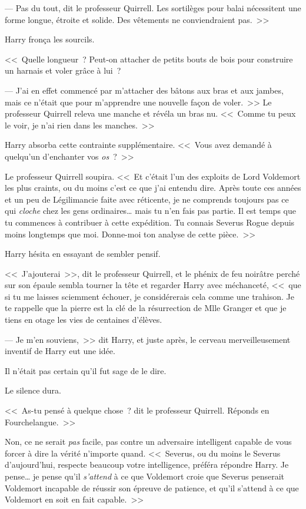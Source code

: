 --- Pas du tout, dit le professeur Quirrell. Les sortilèges pour balai nécessitent une forme longue, étroite et solide. Des vêtements ne conviendraient pas.~>>

Harry fronça les sourcils.

<<~Quelle longueur~? Peut-on attacher de petits bouts de bois pour construire un harnais et voler grâce à lui~?

--- J'ai en effet commencé par m'attacher des bâtons aux bras et aux jambes, mais ce n'était que pour m'apprendre une nouvelle façon de voler.~>> Le professeur Quirrell releva une manche et révéla un bras nu. <<~Comme tu peux le voir, je n'ai rien dans les manches.~>>

Harry absorba cette contrainte supplémentaire. <<~Vous avez demandé à quelqu'un d'enchanter vos \emph{os}~?~>>

Le professeur Quirrell soupira. <<~Et c'était l'un des exploits de Lord Voldemort les plus craints, ou du moins c'est ce que j'ai entendu dire. Après toute ces années et un peu de Légilimancie faite avec réticente, je ne comprends toujours pas ce qui \emph{cloche} chez les gens ordinaires… mais tu n'en fais pas partie. Il est temps que tu commences à contribuer à cette expédition. Tu connais Severus Rogue depuis moins longtemps que moi. Donne-moi ton analyse de cette pièce.~>>

Harry hésita en essayant de sembler pensif.

<<~J'ajouterai~>>, dit le professeur Quirrell, et le phénix de feu noirâtre perché sur son épaule sembla tourner la tête et regarder Harry avec méchanceté, <<~que si tu me laisses sciemment échouer, je considérerais cela comme une trahison. Je te rappelle que la pierre est la clé de la résurrection de Mlle Granger et que je tiens en otage les vies de centaines d'élèves.

--- Je m'en souviens,~>> dit Harry, et juste après, le cerveau merveilleusement inventif de Harry eut une idée.

Il n'était pas certain qu'il fut sage de le dire.

Le silence dura.

<<~As-tu pensé à quelque chose~? dit le professeur Quirrell. Réponds en Fourchelangue.~>>

Non, ce ne serait \emph{pas} facile, pas contre un adversaire intelligent capable de vous forcer à dire la vérité n'importe quand. <<~Severus, ou du moins le Severus d'aujourd'hui, respecte beaucoup votre intelligence, préféra répondre Harry. Je pense… je pense qu'il \emph{s'attend} à ce que Voldemort croie que Severus penserait Voldemort incapable de réussir son épreuve de patience, et qu'il s'attend à ce que Voldemort en soit en fait capable.~>>

